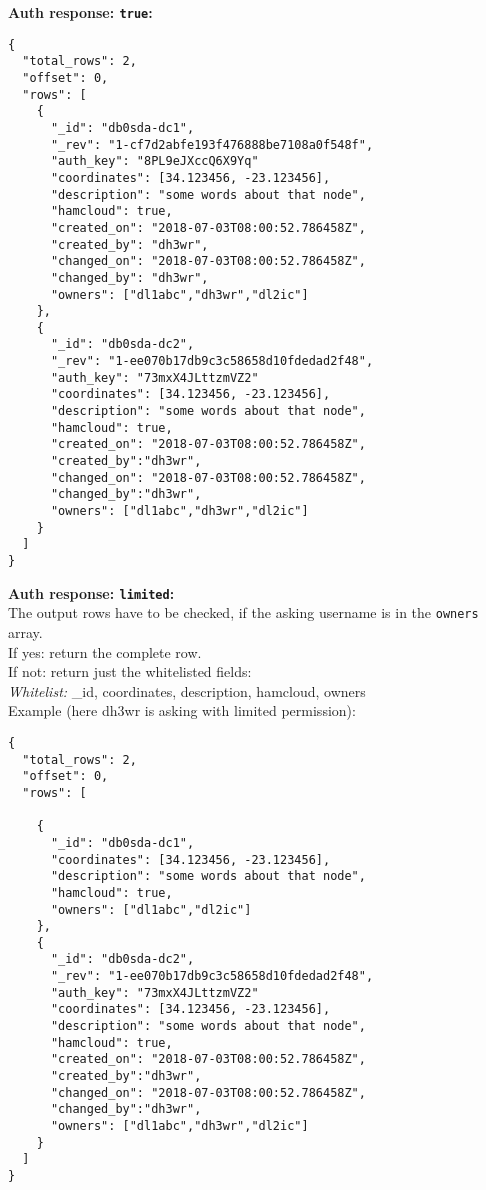 \textbf{Auth response: \texttt{true}:}\\
\begin{lstlisting}
{
  "total_rows": 2,
  "offset": 0,
  "rows": [
    {
      "_id": "db0sda-dc1",
      "_rev": "1-cf7d2abfe193f476888be7108a0f548f",
      "auth_key": "8PL9eJXccQ6X9Yq"
      "coordinates": [34.123456, -23.123456],
      "description": "some words about that node",
      "hamcloud": true,
      "created_on": "2018-07-03T08:00:52.786458Z",
      "created_by": "dh3wr",
      "changed_on": "2018-07-03T08:00:52.786458Z",
      "changed_by": "dh3wr",
      "owners": ["dl1abc","dh3wr","dl2ic"]
    },
    {
      "_id": "db0sda-dc2",
      "_rev": "1-ee070b17db9c3c58658d10fdedad2f48",
      "auth_key": "73mxX4JLttzmVZ2"
      "coordinates": [34.123456, -23.123456],
      "description": "some words about that node",
      "hamcloud": true,
      "created_on": "2018-07-03T08:00:52.786458Z",
      "created_by":"dh3wr",
      "changed_on": "2018-07-03T08:00:52.786458Z",
      "changed_by":"dh3wr",
      "owners": ["dl1abc","dh3wr","dl2ic"]
    }
  ]
}
\end{lstlisting}

\textbf{Auth response: \texttt{limited}:}\\
The output rows have to be checked, if the asking username is in the \texttt{owners} array.\\

If yes: return the complete row.\\
If not: return just the whitelisted fields:\\

\textit{Whitelist:} \_id, coordinates, description, hamcloud, owners\\

Example (here dh3wr is asking with limited permission):
\begin{lstlisting}
{
  "total_rows": 2,
  "offset": 0,
  "rows": [

    {
      "_id": "db0sda-dc1",
      "coordinates": [34.123456, -23.123456],
      "description": "some words about that node",
      "hamcloud": true,
      "owners": ["dl1abc","dl2ic"]
    },
    {
      "_id": "db0sda-dc2",
      "_rev": "1-ee070b17db9c3c58658d10fdedad2f48",
      "auth_key": "73mxX4JLttzmVZ2"
      "coordinates": [34.123456, -23.123456],
      "description": "some words about that node",
      "hamcloud": true,
      "created_on": "2018-07-03T08:00:52.786458Z",
      "created_by":"dh3wr",
      "changed_on": "2018-07-03T08:00:52.786458Z",
      "changed_by":"dh3wr",
      "owners": ["dl1abc","dh3wr","dl2ic"]
    }
  ]
}
\end{lstlisting}

